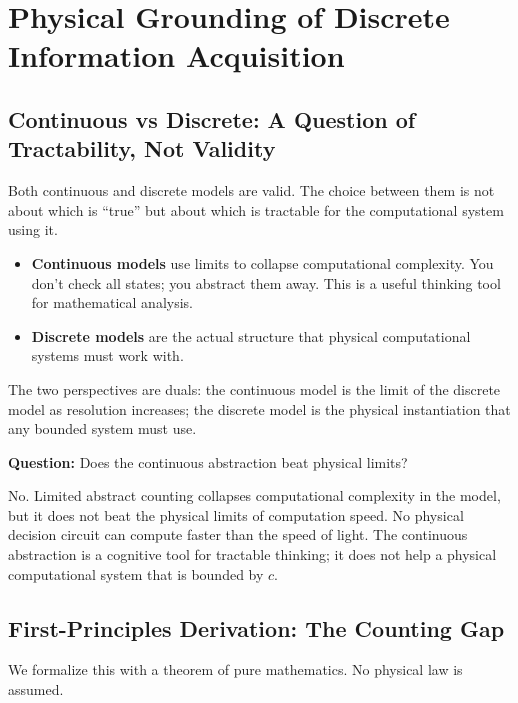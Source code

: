 \section{Physical Grounding of Discrete Information Acquisition}\label{sec:physical-grounding}

\subsection{Continuous vs Discrete: A Question of Tractability, Not Validity}\label{sec:continuous-discrete}

Both continuous and discrete models are valid. The choice between them is not about which is ``true'' but about which is tractable for the computational system using it.

\begin{itemize}
\item \textbf{Continuous models} use limits to collapse computational complexity. You don't check all states; you abstract them away. This is a useful thinking tool for mathematical analysis.

\item \textbf{Discrete models} are the actual structure that physical computational systems must work with.
\end{itemize}

\noindent The two perspectives are duals: the continuous model is the limit of the discrete model as resolution increases; the discrete model is the physical instantiation that any bounded system must use.

\noindent\textbf{Question:} Does the continuous abstraction beat physical limits?

No. Limited abstract counting collapses computational complexity in the model, but it does not beat the physical limits of computation speed. No physical decision circuit can compute faster than the speed of light. The continuous abstraction is a cognitive tool for tractable thinking; it does not help a physical computational system that is bounded by $c$.

\subsection{First-Principles Derivation: The Counting Gap}\label{sec:first-principles}

We formalize this with a theorem of pure mathematics. No physical law is assumed.


